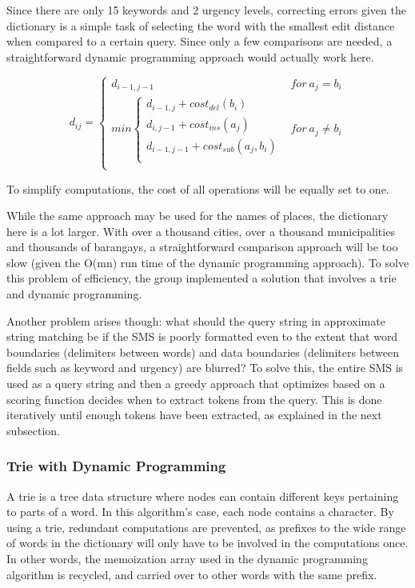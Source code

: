 \documentclass{acm_proc_article-sp}
\begin{document}
Since there are only 15 keywords and 2 urgency levels, correcting errors given the dictionary is a simple task of selecting
the word with the smallest edit distance when compared to a certain query. Since only a few comparisons are needed, a straightforward
dynamic programming approach would actually work here. 

\begin{displaymath}
	d_{ij} = \left\{
		\begin{array}{lr}
			d_{i-1,j-1} & for \ a_j = b_i\\
			min \left\{
				\begin{array}{lr}
						d_{i-1,j} + cost_{del} (b_i)\\
						d_{i,j-1} + cost_{ins} (a_j)\\
						d_{i-1,j-1} + cost_{sub} (a_j, b_i)\\
				\end{array}	\right. & for \ a_j \not = b_i\\
		\end{array}
		\right.
\end{displaymath}

To simplify computations, the cost of all operations will be equally set to one. 

While the same approach may be used for the names of places, the dictionary here is a lot larger. With over a thousand cities, over a thousand municipalities and thousands of barangays, a straightforward comparison approach will be too slow (given the O(mn) run time of the dynamic programming approach). To solve this problem of efficiency, the group implemented a solution that involves a trie and dynamic programming.

Another problem arises though: what should the query string in approximate string matching be if the SMS is poorly formatted even to the extent that word boundaries (delimiters between words) and data boundaries (delimiters between fields such as keyword and urgency) are blurred? To solve this, the entire SMS is used as a query string and then a greedy approach that optimizes based on a scoring function decides when to extract tokens from the query. This is done iteratively until enough tokens have been extracted, as explained in the next subsection. 

\subsubsection{Trie with Dynamic Programming}
\label{trie}
A trie is a tree data structure where nodes can contain different keys pertaining to parts of a word. In this algorithm's case, each node contains a character. By using a trie, redundant computations are prevented, as prefixes to the wide range of words in the dictionary will only have to be involved in the computations once. In other words, the memoization array used in the dynamic programming algorithm is recycled, and carried over to other words with the same prefix.
\end{document}
